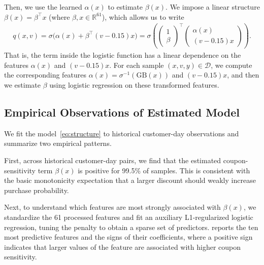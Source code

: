 \documentclass[format=acmsmall, review=false]{acmart}
\newcommand{\bR}{\mathbb{R}}
\begin{document}
Then, we use the learned $\alpha(x)$ to estimate $\beta(x)$. We impose a linear structure $\beta(x)=\beta^\top x$ (where $\beta,x\in\bR^{61}$), which allows us to write   
\begin{align*} 
    q(x, v) =\sigma\big(\alpha(x) + \beta^{\top}  (v - 0.15) x \big) = \sigma\left( 
    \begin{pmatrix} 
    1 \\ \beta
    \end{pmatrix} ^{\top}
    \begin{pmatrix} 
    \alpha(x) \\
    (v - 0.15)x  
    \end{pmatrix}  
    \right).
\end{align*}
That is, the term inside the logistic function has a linear dependence on the features $\alpha(x)$ and $(v-0.15)x$.
For each sample $(x, v, y) \in \mathcal{D}$, we compute the corresponding features $\alpha(x) = \sigma^{-1}(\mathrm{GB}(x))$ and $(v-0.15)x$, and then we estimate $\beta$ using logistic regression on these transformed features.

\subsection{Empirical Observations of Estimated Model} \label{sec:initialObs}

We fit the model~\eqref{eq:structure} to historical customer-day observations and summarize two empirical patterns.

First,
across historical customer-day pairs, we find that the estimated coupon-sensitivity term $\beta(x)$ is positive for 99.5\% of samples. This is consistent with the basic monotonicity expectation that a larger discount should weakly increase purchase probability.

Next, to understand which features are most strongly associated with $\beta(x)$, we standardize the 61 processed features and fit an auxiliary L1-regularized logistic regression, tuning the penalty to obtain a sparse set of predictors.  reports the ten most predictive features and the signs of their coefficients, where a positive sign indicates that larger values of the feature are associated with higher coupon sensitivity.
\end{document}
